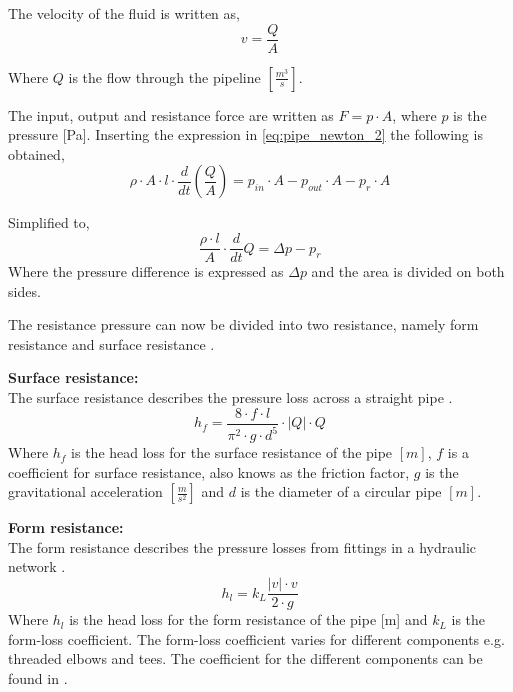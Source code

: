 The velocity of the fluid is written as,
\begin{equation}
v=\frac{Q}{A} 
\end{equation}

Where $Q$ is the flow through the pipeline $\left[\frac{m^3}{s}\right]$.

The input, output and resistance force are written as $F=p \cdot A$, where $p$ is the pressure [Pa]. Inserting the expression in \ref{eq:pipe_newton_2} the following is obtained,
\begin{equation}
\rho \cdot A \cdot l \cdot \frac{d}{dt}\left(\frac{Q}{A}\right) = p_{in}\cdot A - p_{out}\cdot A - p_r \cdot A 
\end{equation}

Simplified to,
\begin{equation}\label{eq:pipe_w_pr}
\frac{\rho \cdot l}{A}\cdot \frac{d}{dt}Q = \Delta p - p_r
\end{equation}
Where the pressure difference is expressed as $\Delta p$ and the area is divided on both sides.

The resistance pressure can now be divided into two resistance, namely form resistance and surface resistance \cite{swamee_pipe}. 

\textbf{Surface resistance:}\\
The surface resistance describes the pressure loss across a straight pipe \cite{swamee_pipe}.
\begin{equation}\label{eq:surface_resistance}
h_f=\frac{8\cdot f\cdot l}{\pi^2\cdot g\cdot d^5} \cdot |Q|\cdot Q
\end{equation}
Where $h_f$ is the head loss for the surface resistance of the pipe $[m]$, $f$ is a coefficient for surface resistance, also knows as the friction factor, $g$ is the gravitational acceleration $\left[\frac{m}{s^2}\right]$ and $d$ is the diameter of a circular pipe $[m]$.

\textbf{Form resistance:}\\
The form resistance describes the pressure losses from fittings in a hydraulic network \cite{swamee_pipe}. 
\begin{equation} \label{eq:form_resistance}
h_l=k_L \frac{ |v|\cdot v }{2\cdot g}
\end{equation}
Where $h_l$ is the head loss for the form resistance of the pipe [m] and $k_L$ is the form-loss coefficient. The form-loss coefficient varies for different components e.g. threaded elbows and tees. The coefficient for the different components can be found in \cite{fundamentals_of_fluid_mechanics}. 

